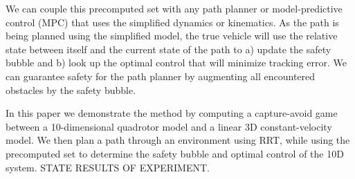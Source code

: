 We can couple this precomputed set with any path planner or model-predictive control (MPC) that uses the simplified dynamics or kinematics. As the path is being planned using the simplified model, the true vehicle will use the relative state between itself and the current state of the path to a) update the safety bubble and b) look up the optimal control that will minimize tracking error. We can guarantee safety for the path planner by augmenting all encountered obstacles by the safety bubble.

In this paper we demonstrate the method by computing a capture-avoid game between a 10-dimensional quadrotor model and a linear 3D constant-velocity model. We then plan a path through an environment using RRT, while using the precomputed set to determine the safety bubble and optimal control of the 10D system. STATE RESULTS OF EXPERIMENT.